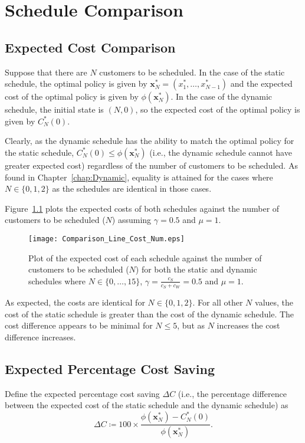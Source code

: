 \chapter{Schedule Comparison}
\label{chap:Comparison}
\section{Expected Cost Comparison}
Suppose that there are $N$ customers to be scheduled. In the case of the static schedule, the optimal policy is given by $\mathbf{x}_{N}^{*} = (x_{1}^{*}, \ldots, x_{N - 1}^{*})$ and the expected cost of the optimal policy is given by $\phi (\mathbf{x}_{N}^{*})$. In the case of the dynamic schedule, the initial state is $(N, 0)$, so the expected cost of the optimal policy is given by $C_{N}^{*} (0)$.

Clearly, as the dynamic schedule has the ability to match the optimal policy for the static schedule, $C_{N}^{*} (0) \leq \phi (\mathbf{x}_{N}^{*})$ (i.e., the dynamic schedule cannot have greater expected cost) regardless of the number of customers to be scheduled. As found in Chapter~\ref{chap:Dynamic}, equality is attained for the cases where $N \in \{ 0, 1, 2 \}$ as the schedules are identical in those cases.

Figure~\ref{Graph_Cost_Comparison} plots the expected costs of both schedules against the number of customers to be scheduled ($N$) assuming $\gamma = 0.5$ and $\mu = 1$.
\begin{figure}[htb]
	\centering
	\texttt{[image: Comparison\_Line\_Cost\_Num.eps]}
	\caption{Plot of the expected cost of each schedule against the number of customers to be scheduled ($N$) for both the static and dynamic schedules where $N \in \{ 0, \ldots, 15 \}$, $\gamma = \frac{c_{S}}{c_{S} + c_{W}} = 0.5$ and $\mu = 1$.}
	\label{Graph_Cost_Comparison}
\end{figure}

As expected, the costs are identical for $N \in \{ 0, 1, 2 \}$. For all other $N$ values, the cost of the static schedule is greater than the cost of the dynamic schedule. The cost difference appears to be minimal for $N \leq 5$, but as $N$ increases the cost difference increases.

\section{Expected Percentage Cost Saving}
Define the expected percentage cost saving $\Delta C$ (i.e., the percentage difference between the expected cost of the static schedule and the dynamic schedule) as
\begin{equation}
	\Delta C \coloneqq 100 \times \frac{\phi (\mathbf{x}_{N}^{*}) - C_{N}^{*} (0)}{\phi (\mathbf{x}_{N}^{*})}.
\end{equation}

